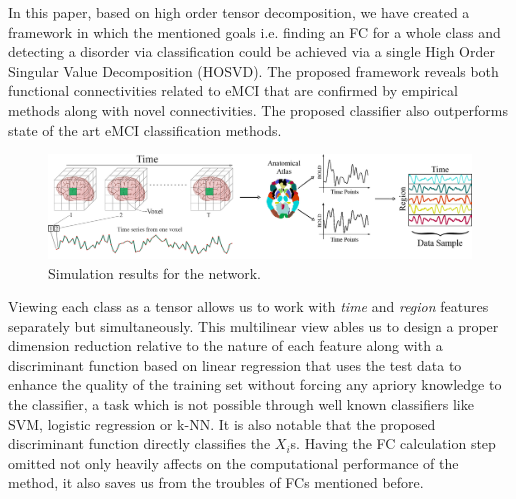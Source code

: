 \documentclass[journal]{IEEEtran}
\begin{document}
	In this paper, based on high order tensor decomposition, we have created a framework in which the mentioned goals i.e. finding an FC for a whole  class and detecting a disorder via classification  could be achieved via a single High Order Singular Value Decomposition (HOSVD). The proposed framework reveals both functional connectivities related to eMCI that are confirmed by empirical methods along with novel connectivities. The proposed classifier also outperforms state of the art eMCI classification methods. 
	\begin{figure}[!t]
		\centering
		\includegraphics[width=6in]{Data}
		
		\caption{Simulation results for the network.}
		\label{g1.1}
	\end{figure}
	
	Viewing each class as a tensor allows us to work with \textit{time} and \textit{region} features separately but simultaneously. This multilinear view
	ables us to design a proper dimension reduction relative to the nature of each feature along with a discriminant function based on linear regression that uses the test data to enhance the quality of the training set without forcing any apriory knowledge to the classifier, a task which is not possible through well known classifiers like SVM, logistic regression or k-NN. It is also notable that the proposed discriminant function  
	directly classifies the $X_i$s. Having the FC calculation step omitted not only heavily affects on the computational performance of the method, it also saves us from the troubles of FCs mentioned before.        
	
	
	
	
\end{document}
